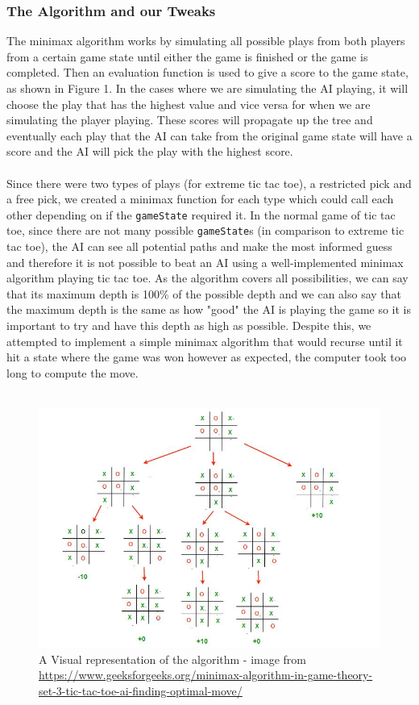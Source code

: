 \documentclass[10pt]{article}
\begin{document}
\subsubsection{The Algorithm and our Tweaks}
The minimax algorithm works by simulating all possible plays from both players from a certain game state until either the game is finished or the game is completed. Then an evaluation function is used to give a score to the game state, as shown in Figure 1. In the cases where we are simulating the AI playing, it will choose the play that has the highest value and vice versa for when we are simulating the player playing. These scores will propagate up the tree and eventually each play that the AI can take from the original game state will have a score and the AI will pick the play with the highest score.
\\\\Since there were two types of plays (for extreme tic tac toe), a restricted pick and a free pick, we created a minimax function for each type which could call each other depending on if the {\tt{gameState}} required it. In the normal game of tic tac toe, since there are not many possible {\tt{gameState}}s (in comparison to extreme tic tac toe), the AI can see all potential paths and make the most informed guess and therefore it is not possible to beat an AI using a well-implemented minimax algorithm playing tic tac toe. As the algorithm covers all possibilities, we can say that its maximum depth is 100\% of the possible depth and we can also say that the maximum depth is the same as how "good" the AI is playing the game so it is important to try and have this depth as high as possible. Despite this, we attempted to implement a simple minimax algorithm that would recurse until it hit a state where the game was won however as expected, the computer took too long to compute the move.
\\\\
\begin{figure}
    \includegraphics[scale = 0.5]{minimax.jpeg}
    \caption{A Visual representation of the algorithm - image from \url{https://www.geeksforgeeks.org/minimax-algorithm-in-game-theory-set-3-tic-tac-toe-ai-finding-optimal-move/}}
\end{figure}
\end{document}
